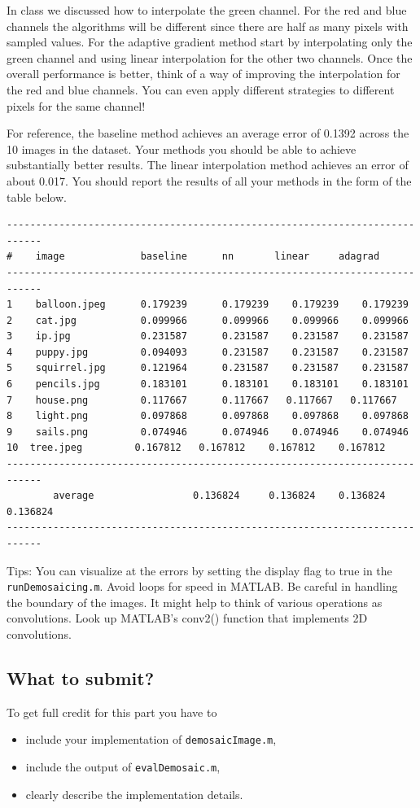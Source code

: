 \documentclass[10pt,letterpaper]{article}
\newcommand{\cmd}[1] {{\color{blue}\texttt{#1}}}
\begin{document}
In class we discussed how to interpolate the green channel. For the red and blue channels the algorithms will be different since there are half as many pixels with sampled values. For the adaptive gradient method start by interpolating only the green channel and using linear interpolation for the other two channels. Once the overall performance is better, think of a way of improving the interpolation for the red and blue channels. You can even apply different strategies to different pixels for the same channel! 

For reference, the baseline method achieves an average error of 0.1392 across the 10 images in the dataset. Your methods you should be able to achieve substantially better results. The linear interpolation method achieves an error of about 0.017. You should report the results of all your methods in the form of the table below.

\newpage

\begin{verbatim}
----------------------------------------------------------------------------
# 	 image             baseline      nn       linear     adagrad
----------------------------------------------------------------------------
1 	 balloon.jpeg      0.179239 	 0.179239 	 0.179239 	 0.179239 
2 	 cat.jpg           0.099966 	 0.099966 	 0.099966 	 0.099966 
3 	 ip.jpg            0.231587 	 0.231587 	 0.231587 	 0.231587 
4 	 puppy.jpg         0.094093 	 0.231587 	 0.231587 	 0.231587 
5 	 squirrel.jpg      0.121964 	 0.231587 	 0.231587 	 0.231587 
6 	 pencils.jpg       0.183101 	 0.183101 	 0.183101 	 0.183101 
7 	 house.png         0.117667 	 0.117667   0.117667   0.117667 
8 	 light.png         0.097868 	 0.097868 	 0.097868 	 0.097868 
9 	 sails.png         0.074946 	 0.074946 	 0.074946 	 0.074946 
10  tree.jpeg         0.167812 	 0.167812 	 0.167812 	 0.167812 
----------------------------------------------------------------------------
 	 	average 	        	0.136824 	 0.136824 	 0.136824 	 0.136824 
----------------------------------------------------------------------------
\end{verbatim}

Tips: You can visualize at the errors by setting the display flag to true in the \cmd{runDemosaicing.m}. Avoid loops for speed in MATLAB. Be careful in handling the boundary of the images. It might help to think of various operations as convolutions. Look up MATLAB's conv2() function that implements 2D convolutions.

\subsection{What to submit?}
To get full credit for this part you have to 
\begin{itemize}
\item include your implementation of \cmd{demosaicImage.m}, 
\item include the output of \cmd{evalDemosaic.m},
\item clearly describe the implementation details.
\end{itemize}
\end{document}
